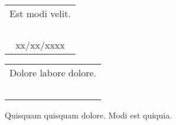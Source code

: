 \documentclass[a4paper,landscape]{article}%
\begin{document}
\hspace*{75pt}%
\begin{tabular}{|m{4cm} m{5cm}|}%
\hline%
\multicolumn{2}{|c|}{Est modi velit.}\\%
&\\%
&\\%
&\\%
&\\%
\multicolumn{2}{|c|}{xx/xx/xxxx}\\%
\hline%
\end{tabular}%
\hspace*{125pt}%
\begin{tabular}{|m{4cm} m{5cm}|}%
\hline%
\multicolumn{2}{|c|}{Dolore labore dolore.}\\%
&\\%
&\\%
&\\%
&\\%
&\\%
\hline%
\end{tabular}%
\linebreak%
\linebreak%
\hspace*{140pt}%
Quisquam quisquam dolore.%
\hspace*{300pt}%
Modi est quiquia.%
\end{document}
